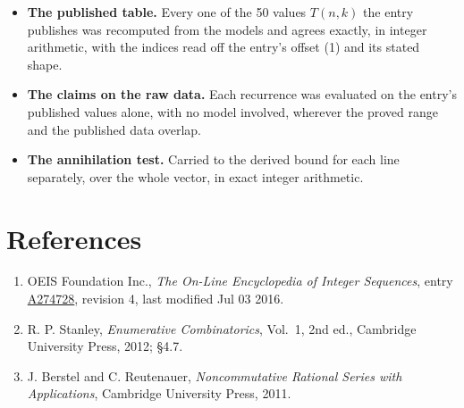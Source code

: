 \documentclass[11pt]{article}
\theoremstyle{definition}
\begin{document}
\begin{itemize}

\item {\bfseries The published table.} Every one of the 50 values $T(n,k)$ the entry publishes was recomputed from the models and agrees exactly, in integer arithmetic, with the indices read off the entry's offset (1) and its stated shape.

\item {\bfseries The claims on the raw data.} Each recurrence was evaluated on the entry's published values alone, with no model involved, wherever the proved range and the published data overlap.

\item {\bfseries The annihilation test.} Carried to the derived bound for each line separately, over the whole vector, in exact integer arithmetic.

\end{itemize}

\section{References}

\begin{enumerate}

\item OEIS Foundation Inc., \emph{The On-Line Encyclopedia of Integer Sequences}, entry \href{https://oeis.org/A274728}{A274728}, revision 4, last modified Jul 03 2016.

\item R. P. Stanley, \emph{Enumerative Combinatorics}, Vol.~1, 2nd ed., Cambridge University Press, 2012; \S4.7.

\item J. Berstel and C. Reutenauer, \emph{Noncommutative Rational Series with Applications}, Cambridge University Press, 2011.

\end{enumerate}
\end{document}
